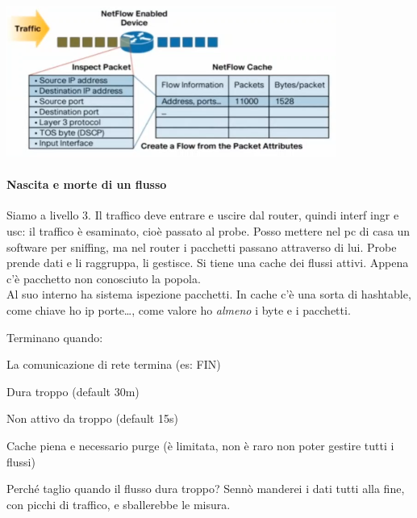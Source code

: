 \documentclass[10pt]{book}
\begin{document}
\begin{multicols}{2}
\begin{center}
	\includegraphics[scale=0.75]{flowcache.png}
\end{center}
\columnbreak
\paragraph{Nascita e morte di un flusso} Siamo a livello 3. Il traffico deve entrare e uscire dal router, quindi interf ingr e usc: il traffico è esaminato, cioè passato al probe. Posso mettere nel pc di casa un software per sniffing, ma nel router i pacchetti passano attraverso di lui. Probe prende dati e li raggruppa, li gestisce. Si tiene una cache dei flussi attivi. Appena c'è pacchetto non conosciuto la popola.\\Al suo interno ha sistema ispezione pacchetti. In cache c'è una sorta di hashtable, come chiave ho ip porte\ldots, come valore ho \textit{almeno} i byte e i pacchetti.
\end{multicols}

Terminano quando:
\begin{list}{}{}
	\item La comunicazione di rete termina (es: FIN)
	\item Dura troppo (default 30m)
	\item Non attivo da troppo (default 15s)
	\item Cache piena e necessario purge (è limitata, non è raro non poter gestire tutti i flussi)
\end{list}
Perché taglio quando il flusso dura troppo? Sennò manderei i dati tutti alla fine, con picchi di traffico, e sballerebbe le misura.
\end{document}
